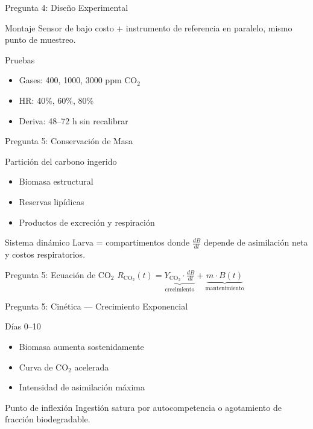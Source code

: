\documentclass[aspectratio=169, 11pt]{beamer}
\begin{document}
\begin{frame}{Pregunta 4: Diseño Experimental}
\begin{block}{Montaje}
\footnotesize
Sensor de bajo costo + instrumento de referencia en paralelo, mismo punto de muestreo.
\end{block}
\begin{exampleblock}{Pruebas}
\footnotesize
\begin{itemize}
    \item Gases: 400, 1000, 3000 ppm CO$_2$
    \item HR: 40\%, 60\%, 80\%
    \item Deriva: 48--72 h sin recalibrar
\end{itemize}
\end{exampleblock}
\end{frame}

\begin{frame}{Pregunta 5: Conservación de Masa}
\begin{block}{Partición del carbono ingerido}
\footnotesize
\begin{itemize}
    \item Biomasa estructural
    \item Reservas lipídicas
    \item Productos de excreción y respiración
\end{itemize}
\end{block}
\begin{exampleblock}{Sistema dinámico}
\footnotesize
Larva = compartimentos donde $\frac{dB}{dt}$ depende de asimilación neta y costos respiratorios.
\end{exampleblock}
\end{frame}

\begin{frame}{Pregunta 5: Ecuación de CO$_2$}
\centering
\Large
$R_{\text{CO}_2}(t) = \underbrace{Y_{\text{CO}_2} \cdot \frac{dB}{dt}}_{\text{crecimiento}} + \underbrace{m \cdot B(t)}_{\text{mantenimiento}}$
\end{frame}

\begin{frame}{Pregunta 5: Cinética --- Crecimiento Exponencial}
\begin{block}{Días 0--10}
\footnotesize
\begin{itemize}
    \item Biomasa aumenta sostenidamente
    \item Curva de CO$_2$ acelerada
    \item Intensidad de asimilación máxima
\end{itemize}
\end{block}
\begin{exampleblock}{Punto de inflexión}
\footnotesize
Ingestión satura por autocompetencia o agotamiento de fracción biodegradable.
\end{exampleblock}
\end{frame}
\end{document}
